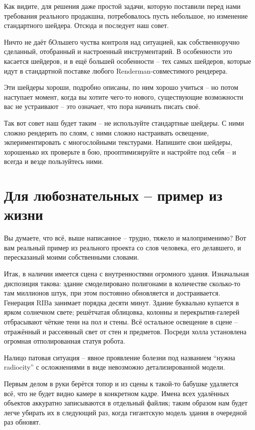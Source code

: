  Как видите, для решения даже простой задачи,
    которую поставили перед нами требования реального продакшна,
    потребовалось пусть небольшое, но изменение стандартного шейдера.
    Отсюда и последует наш совет.
  

 Ничто не даёт бОльшего чуства контроля над
    ситуацией, как собственноручно сделанный, отобранный и настроенный
    инструментарий. В особенности это касается шейдеров, и в ещё
    большей особенности – тех самых шейдеров, которые идут в
    стандартной поставке любого Renderman-совместимого
    рендерера.
  

 Эти шейдеры хороши, подробно описаны, по ним хорошо
    учиться – но потом наступает момент, когда вы хотите чего-то
    нового, существующие возможности вас не устраивают – это означает,
    что пора начинать писать своё.
  

 Так вот совет наш будет таким – не используйте
    стандартные шейдеры. С ними сложно рендерить по слоям, с ними
    сложно настраивать освещение, экпериментировать с многослойными
    текстурами. Напишите свои шейдеры, хорошенько их проверьте в бою,
    прооптимизируйте и настройте под себя – и всегда и везде
    пользуйтесь ними.
  \chapter*{Для
    любознательных – пример из жизни}
  

 Вы думаете, что всё, выше написанное – трудно,
    тяжело и малоприменимо? Вот вам реальный пример из реального
    проекта со слов человека, его делавшего, и пересказаный моими
    собственными словами.
  

 Итак, в наличии имеется сцена с внутренностями
    огромного здания. Изначальная диспозиция такова: здание
    смоделировано полигонами в количестве сколько-то там миллионов
    штук, при этом постоянно обновляется и достраивается. Генерация
    RIBа занимает порядка десяти минут. Здание буквально купается в
    ярком солнечном свете; решётчатая облицовка, колонны и
    перекрытия-галерей отбрасывают чёткие тени на пол и стены. Всё
    остальное освещение в сцене – отражённый и рассеянный свет от стен
    и предметов. Посреди холла установлена огромная отполированная
    статуя робота.
  

 Налицо патовая ситуация – явное проявление болезни
    под названием “нужна radiocity” с осложнениями в виде невозможно
    детализированной модели.
  

 Первым делом в руки берётся топор и из сцены к
    такой-то бабушке удаляется всё, что не будет видно камере в
    конкретном кадре. Имена всех удалённых объектов аккуратно
    записываются в отдельный файлик; таким образом нам будет легче
    убирать их в следующий раз, когда гигантскую модель здания в
    очередной раз обновят.
  


